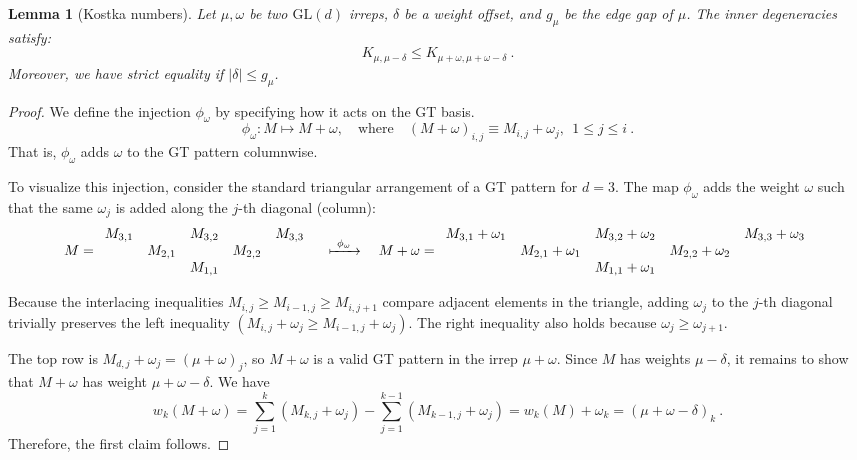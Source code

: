 \documentclass[11pt,letterpaper]{article}
\newtheorem{lem}{Lemma}
\begin{document}
\begin{lem}[Kostka numbers]\label{lem:kostka}
    Let $\mu,\omega$ be two $\mathrm{GL}(d)$ irreps, $\delta$ be a weight offset, and $g_\mu$ be the edge gap of $\mu$. The inner degeneracies satisfy:
    \begin{equation}
        K_{\mu,\mu-\delta} \leq K_{\mu+\omega,\mu+\omega-\delta} \ .
    \end{equation}
    Moreover, we have strict equality if $|\delta| \leq g_\mu$.
\end{lem}
\begin{proof}
We define the injection $\phi_\omega$ by specifying how it acts on the GT basis.
\begin{equation}
    \phi_\omega: M\mapsto M+\omega,\quad\text{where}\quad (M+\omega)_{i,j} \equiv M_{i,j} + \omega_j, \ \ 1\leq j\leq i\ .
\end{equation}
That is, $\phi_\omega$ adds $\omega$ to the GT pattern columnwise. 

To visualize this injection, consider the standard triangular arrangement of a GT pattern for $d=3$. The map $\phi_\omega$ adds the weight $\omega$ such that the same $\omega_j$ is added along the $j$-th diagonal (column):
\begin{equation}
    M = \begin{array}{ccccc}
        M_{3,1} & & M_{3,2} & & M_{3,3} \\
        & M_{2,1} & & M_{2,2} & \\
        & & M_{1,1} & & 
    \end{array}
    \quad \xmapsto{\ \phi_\omega\ } \quad
    M+\omega = \begin{array}{ccccc}
        M_{3,1}+\omega_1 & & M_{3,2}+\omega_2 & & M_{3,3}+\omega_3 \\
        & M_{2,1}+\omega_1 & & M_{2,2}+\omega_2 & \\
        & & M_{1,1}+\omega_1 & & 
    \end{array}
\end{equation}

Because the interlacing inequalities $M_{i,j} \ge M_{i-1,j} \ge M_{i,j+1}$ compare adjacent elements in the triangle, adding $\omega_j$ to the $j$-th diagonal trivially preserves the left inequality $(M_{i,j}+\omega_j \ge M_{i-1,j}+\omega_j)$. The right inequality also holds because $\omega_j\ge\omega_{j+1}$.

The top row is $M_{d,j}+\omega_j = (\mu+\omega)_j$, so $M+\omega$ is a valid GT pattern in the irrep $\mu+\omega$. Since $M$ has weights $\mu-\delta$, it remains to show that $M+\omega$ has weight $\mu+\omega-\delta$. We have 
\begin{equation}
    w_k(M+\omega)=\sum_{j=1}^k (M_{k,j}+ \omega_j) - \sum_{j=1}^{k-1} (M_{k-1,j} + \omega_j) =w_k(M)+ \omega_k =(\mu+\omega-\delta)_k\ .
\end{equation}
Therefore, the first claim follows.


\end{proof}
\end{document}
